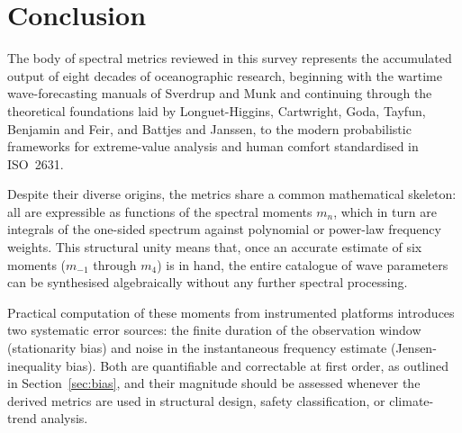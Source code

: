 \documentclass[journal]{IEEEtran}
\begin{document}
    \section{Conclusion}

    The body of spectral metrics reviewed in this survey represents the
    accumulated output of eight decades of oceanographic research,
    beginning with the wartime wave-forecasting manuals of Sverdrup and
    Munk and continuing through the theoretical foundations laid by
    Longuet-Higgins, Cartwright, Goda, Tayfun, Benjamin and Feir, and
    Battjes and Janssen, to the modern probabilistic frameworks for
    extreme-value analysis and human comfort standardised in ISO~2631.

    Despite their diverse origins, the metrics share a common mathematical
    skeleton: all are expressible as functions of the spectral moments
    $m_n$, which in turn are integrals of the one-sided spectrum against
    polynomial or power-law frequency weights.
    This structural unity means that, once an accurate estimate of six
    moments ($m_{-1}$ through $m_4$) is in hand, the entire catalogue of
    wave parameters can be synthesised algebraically without any
    further spectral processing.

    Practical computation of these moments from instrumented platforms
    introduces two systematic error sources: the finite duration of the
    observation window (stationarity bias) and noise in the instantaneous
    frequency estimate (Jensen-inequality bias).
    Both are quantifiable and correctable at first order, as outlined in
    Section~\ref{sec:bias}, and their magnitude should be assessed
    whenever the derived metrics are used in structural design, safety
    classification, or climate-trend analysis.
\end{document}
